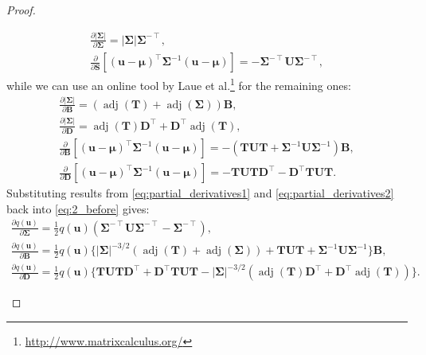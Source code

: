 \documentclass{article}
\theoremstyle{definition}
\theoremstyle{remark}
\DeclareMathOperator{\adj}{adj}
\newcommand{\dS}{\frac{\partial}{\partial\mathbf{S}}}
\newcommand{\dD}{\frac{\partial}{\partial\mathbf{D}}}
\newcommand{\dB}{\frac{\partial}{\partial\mathbf{B}}}
\begin{document}
\begin{proof}
\begin{enumerate}
\begin{equation}
\begin{gathered}
        \frac{\partial |\bm\Sigma|}{\partial \bm\Sigma} =
        |\bm\Sigma|\bm\Sigma^{-\intercal}, \\
        \dS[(\mathbf{u} - \bm\mu)^\intercal\bm\Sigma^{-1}(\mathbf{u} -
        \bm\mu)] = -\bm\Sigma^{-\intercal}\mathbf{U}\bm\Sigma^{-\intercal},
      \end{gathered}
    \end{equation}
    while we can use an online tool by Laue et
    al.\footnote{\url{http://www.matrixcalculus.org/}}
    \cite{DBLP:conf/nips/LaueMG18} for the remaining ones:
    \begin{equation} \label{eq:partial_derivatives2}
      \begin{gathered}
        \frac{\partial |\bm\Sigma|}{\partial \mathbf{B}} =
        (\adj(\mathbf{T}) + \adj(\bm\Sigma))\mathbf{B}, \\
        \frac{\partial |\bm\Sigma|}{\partial \mathbf{D}} =
        \adj(\mathbf{T})\mathbf{D}^\intercal + \mathbf{D}^\intercal
        \adj(\mathbf{T}), \\
        \dB[(\mathbf{u} - \bm\mu)^\intercal\bm\Sigma^{-1}(\mathbf{u} -
        \bm\mu)] = -(\mathbf{TUT} +
        \bm\Sigma^{-1}\mathbf{U}\bm\Sigma^{-1})\mathbf{B}, \\
        \dD[(\mathbf{u} - \bm\mu)^\intercal\bm\Sigma^{-1}(\mathbf{u} - \bm\mu)] =
        -\mathbf{T}\mathbf{UT}\mathbf{D}^\intercal -
        \mathbf{D}^\intercal\mathbf{T}\mathbf{UT}.
      \end{gathered}
    \end{equation}
    Substituting results from \eqref{eq:partial_derivatives1} and
    \eqref{eq:partial_derivatives2} back into \eqref{eq:2_before} gives:
    \begin{gather*}
      \frac{\partial q(\mathbf{u})}{\partial \bm\Sigma} =
      \frac{1}{2}q(\mathbf{u})(\bm\Sigma^{-\intercal}\mathbf{U}\bm\Sigma^{-\intercal}
      - \bm\Sigma^{-\intercal}), \\
      \frac{\partial q(\mathbf{u})}{\partial \mathbf{B}} =
      \frac{1}{2}q(\mathbf{u}) \{ |\bm\Sigma|^{-3/2}(\adj(\mathbf{T}) +
      \adj(\bm\Sigma)) + \mathbf{TUT} +
      \bm\Sigma^{-1}\mathbf{U}\bm\Sigma^{-1} \} \mathbf{B}, \\
      \frac{\partial q(\mathbf{u})}{\partial \mathbf{D}} =
      \frac{1}{2}q(\mathbf{u}) \{ \mathbf{T}\mathbf{UT}\mathbf{D}^\intercal +
      \mathbf{D}^\intercal\mathbf{T}\mathbf{UT} -
      |\bm\Sigma|^{-3/2}(\adj(\mathbf{T})\mathbf{D}^\intercal +
      \mathbf{D}^\intercal \adj(\mathbf{T})) \}.
    \end{gather*}

\end{enumerate}
\end{proof}
\end{document}

